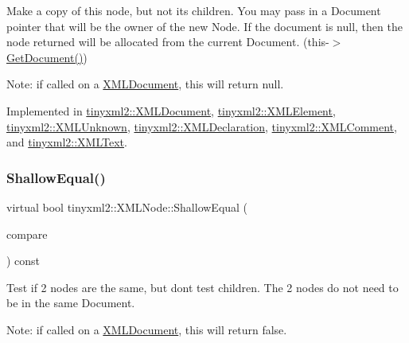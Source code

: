 Make a copy of this node, but not its children. You may pass in a Document pointer that will be the owner of the new Node. If the \textquotesingle{}document\textquotesingle{} is null, then the node returned will be allocated from the current Document. (this-\/$>$\mbox{\hyperlink{classtinyxml2_1_1_x_m_l_node_af343d1ef0b45c0020e62d784d7e67a68}{Get\+Document()}})

Note\+: if called on a \mbox{\hyperlink{classtinyxml2_1_1_x_m_l_document}{X\+M\+L\+Document}}, this will return null. 

Implemented in \mbox{\hyperlink{classtinyxml2_1_1_x_m_l_document_aa37cc1709d7e1e988bc17dcfb24a69b8}{tinyxml2\+::\+X\+M\+L\+Document}}, \mbox{\hyperlink{classtinyxml2_1_1_x_m_l_element_aafa2807a45b28fe096b29d76e6a13b7c}{tinyxml2\+::\+X\+M\+L\+Element}}, \mbox{\hyperlink{classtinyxml2_1_1_x_m_l_unknown_ab73b48b819aa4b2ef3815dc2d7d20d5f}{tinyxml2\+::\+X\+M\+L\+Unknown}}, \mbox{\hyperlink{classtinyxml2_1_1_x_m_l_declaration_ad9d60e6d2df75c13eb6bf7319985b747}{tinyxml2\+::\+X\+M\+L\+Declaration}}, \mbox{\hyperlink{classtinyxml2_1_1_x_m_l_comment_adf5b5c0319351dcc339df098d11e8fb2}{tinyxml2\+::\+X\+M\+L\+Comment}}, and \mbox{\hyperlink{classtinyxml2_1_1_x_m_l_text_a86d265c93152726c8c6831e9594840e6}{tinyxml2\+::\+X\+M\+L\+Text}}.

\mbox{\label{classtinyxml2_1_1_x_m_l_node_a7ce18b751c3ea09eac292dca264f9226}} 
\subsubsection{\texorpdfstring{Shallow\+Equal()}{ShallowEqual()}}
{\footnotesize\ttfamily virtual bool tinyxml2\+::\+X\+M\+L\+Node\+::\+Shallow\+Equal (\begin{DoxyParamCaption}\item[{const \mbox{\hyperlink{classtinyxml2_1_1_x_m_l_node}{X\+M\+L\+Node}} $\ast$}]{compare }\end{DoxyParamCaption}) const\hspace{0.3cm}{\ttfamily [pure virtual]}}

Test if 2 nodes are the same, but don\textquotesingle{}t test children. The 2 nodes do not need to be in the same Document.

Note\+: if called on a \mbox{\hyperlink{classtinyxml2_1_1_x_m_l_document}{X\+M\+L\+Document}}, this will return false. 

